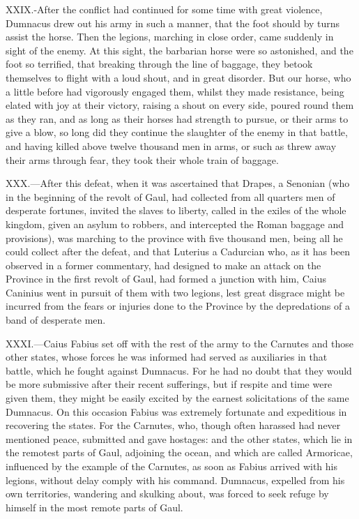 XXIX.-After the conflict had continued for some time with great
violence, Dumnacus drew out his army in such a manner, that the foot
should by turns assist the horse. Then the legions, marching in close
order, came suddenly in sight of the enemy. At this sight, the barbarian
horse were so astonished, and the foot so terrified, that breaking
through the line of baggage, they betook themselves to flight with a
loud shout, and in great disorder. But our horse, who a little before
had vigorously engaged them, whilst they made resistance, being elated
with joy at their victory, raising a shout on every side, poured round
them as they ran, and as long as their horses had strength to pursue, or
their arms to give a blow, so long did they continue the slaughter of
the enemy in that battle, and having killed above twelve thousand men in
arms, or such as threw away their arms through fear, they took their
whole train of baggage.

XXX.—After this defeat, when it was ascertained that Drapes, a Senonian
(who in the beginning of the revolt of Gaul, had collected from all
quarters men of desperate fortunes, invited the slaves to liberty,
called in the exiles of the whole kingdom, given an asylum to robbers,
and intercepted the Roman baggage and provisions), was marching to the
province with five thousand men, being all he could collect after the
defeat, and that Luterius a Cadurcian who, as it has been observed in a
former commentary, had designed to make an attack on the Province in the
first revolt of Gaul, had formed a junction with him, Caius Caninius
went in pursuit of them with two legions, lest great disgrace might be
incurred from the fears or injuries done to the Province by the
depredations of a band of desperate men.

XXXI.—Caius Fabius set off with the rest of the army to the Carnutes
and those other states, whose forces he was informed had served as
auxiliaries in that battle, which he fought against Dumnacus. For he had
no doubt that they would be more submissive after their recent
sufferings, but if respite and time were given them, they might be
easily excited by the earnest solicitations of the same Dumnacus. On
this occasion Fabius was extremely fortunate and expeditious in
recovering the states. For the Carnutes, who, though often harassed had
never mentioned peace, submitted and gave hostages: and the other
states, which lie in the remotest parts of Gaul, adjoining the ocean,
and which are called Armoricae, influenced by the example of the
Carnutes, as soon as Fabius arrived with his legions, without delay
comply with his command. Dumnacus, expelled from his own territories,
wandering and skulking about, was forced to seek refuge by himself in
the most remote parts of Gaul.

